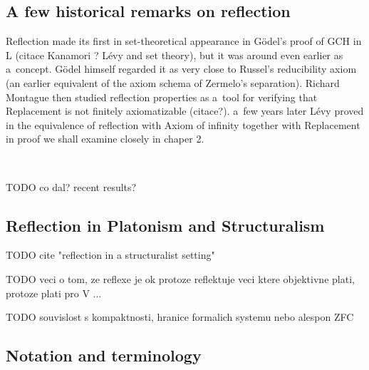 
\subsection{A few historical remarks on reflection}\label{sec:History}  %
 
 
Reflection made its first in set-theoretical appearance in G{\"o}del's proof of GCH in L  (citace Kanamori ? Lévy and set theory), but it was around even earlier as a~concept. G{\"o}del himself regarded it as very close to Russel's reducibility axiom (an earlier equivalent of the axiom schema of Zermelo's separation). Richard Montague then studied reflection properties as a~tool for verifying that Replacement is not finitely axiomatizable (citace?). a~few years later Lévy proved in \cite{Levy60a} the equivalence of reflection with Axiom of infinity together with Replacement in proof we shall examine closely in chaper 2.

\

TODO co dal? recent results?

\subsection{Reflection in Platonism and Structuralism}
TODO cite "reflection in a structuralist setting"

TODO veci o tom, ze reflexe je ok protoze reflektuje veci ktere objektivne plati, protoze plati pro V ...

TODO souvislost s kompaktnosti, hranice formalich systemu nebo alespon ZFC

\subsection{Notation and terminology}


